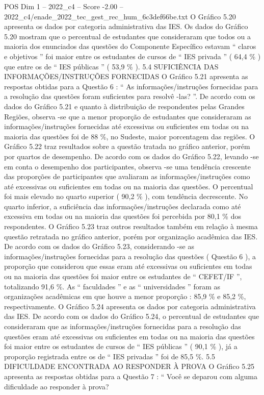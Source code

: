 \begin{textsample}{POS Dim 1 – 2022\_c4 – Score -2.00 – 2022\_c4/enade\_2022\_tec\_gest\_rec\_hum\_6c3def66be.txt}
O Gráfico 5.20 apresenta os dados por categoria administrativa das IES.
Os dados do Gráfico 5.20 mostram que o percentual de estudantes que consideraram que todos ou a maioria dos enunciados das questões do Componente Específico estavam “ claros e objetivos ” foi maior entre os estudantes de cursos de “ IES privada ” ( 64,4 \% ) que entre os de “ IES públicas ” ( 53,9 \% ). 5.4 SUFICIÊNCIA DAS INFORMAÇÕES/INSTRUÇÕES FORNECIDAS O Gráfico 5.21 apresenta as respostas obtidas para a Questão 6 : “ As informações/instruções fornecidas para a resolução das questões foram suficientes para resolvê -las? ”.
De acordo com os dados do Gráfico 5.21 e quanto à distribuição de respondentes pelas Grandes Regiões, observa -se que a menor proporção de estudantes que consideraram as informações/instruções fornecidas até excessivas ou suficientes em todas ou na maioria das questões foi de 88 \%, no Sudeste, maior porcentagem das regiões.
O Gráfico 5.22 traz resultados sobre a questão tratada no gráfico anterior, porém por quartos de desempenho.
De acordo com os dados do Gráfico 5.22, levando -se em conta o desempenho dos participantes, observa -se uma tendência crescente das proporções de participantes que avaliaram as informações/instruções como até excessivas ou suficientes em todas ou na maioria das questões.
O percentual foi mais elevado no quarto superior ( 90,2 \% ), com tendência decrescente.
No quarto inferior, a suficiência das informações/instruções declarada como até excessiva em todas ou na maioria das questões foi percebida por 80,1 \% dos respondentes.
O Gráfico 5.23 traz outros resultados também em relação à mesma questão retratada no gráfico anterior, porém por organização acadêmica das IES.
De acordo com os dados do Gráfico 5.23, considerando -se as informações/instruções fornecidas para a resolução das questões ( Questão 6 ), a proporção que considerou que essas eram até excessivas ou suficientes em todas ou na maioria das questões foi maior entre os estudantes de “ CEFET/IF ”, totalizando 91,6 \%.
As “ faculdades ” e as “ universidades ” foram as organizações acadêmicas em que houve a menor proporção : 85,9 \% e 85,2 \%, respectivamente.
O Gráfico 5.24 apresenta os dados por categoria administrativa das IES.
De acordo com os dados do Gráfico 5.24, o percentual de estudantes que consideraram que as informações/instruções fornecidas para a resolução das questões eram até excessivas ou suficientes em todas ou na maioria das questões foi maior entre os estudantes de cursos de “ IES públicas ” ( 90,1 \% ), já a proporção registrada entre os de “ IES privadas ” foi de 85,5 \%. 5.5 DIFICULDADE ENCONTRADA AO RESPONDER À PROVA O Gráfico 5.25 apresenta as respostas obtidas para a Questão 7 : “ Você se deparou com alguma dificuldade ao responder à prova?

\end{textsample}
